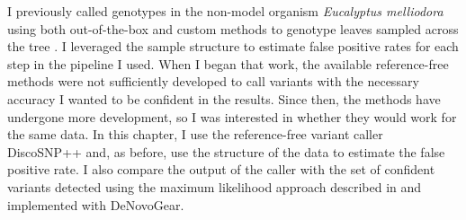\documentclass{article}
\begin{document}
\begin{outline}
	\item I previously called genotypes in the non-model organism \textit{Eucalyptus melliodora} using both out-of-the-box and custom methods to genotype leaves sampled across the tree \parencite{orr_phylogenomic_2020}. I leveraged the sample structure to estimate false positive rates for each step in the pipeline I used. When I began that work, the available reference-free methods were not sufficiently developed to call variants with the necessary accuracy I wanted to be confident in the results. Since then, the methods have undergone more development, so I was interested in whether they would work for the same data. In this chapter, I use the reference-free variant caller DiscoSNP++ and, as before, use the structure of the data to estimate the false positive rate. I also compare the output of the caller with the set of confident variants detected using the maximum likelihood approach described in \parencite{orr_phylogenomic_2020} and implemented with DeNovoGear. %

\end{outline}
\end{document}
